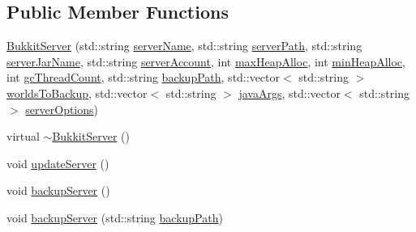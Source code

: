 \subsection*{Public Member Functions}
\begin{DoxyCompactItemize}
\item 
\hyperlink{class_minecraft_server_service_1_1_bukkit_server_ae901c79addfe2c8fa213d9be74140565}{Bukkit\+Server} (std\+::string \hyperlink{class_minecraft_server_service_1_1_bukkit_server_abd8434ba92225f8b6d57c3cffd801f8b}{server\+Name}, std\+::string \hyperlink{class_minecraft_server_service_1_1_bukkit_server_a670b58ed6f157e10f439fd8bd3554081}{server\+Path}, std\+::string \hyperlink{class_minecraft_server_service_1_1_bukkit_server_a715fdfd8db6b4bfd3f0da088193c4c39}{server\+Jar\+Name}, std\+::string \hyperlink{class_minecraft_server_service_1_1_bukkit_server_af39cd743eeb5c6daccdbe07de59b6b44}{server\+Account}, int \hyperlink{class_minecraft_server_service_1_1_bukkit_server_ad8916f8d6fcf0df8922519ba2df42977}{max\+Heap\+Alloc}, int \hyperlink{class_minecraft_server_service_1_1_bukkit_server_a62ebcb90b98dc041c7c819a8af39c320}{min\+Heap\+Alloc}, int \hyperlink{class_minecraft_server_service_1_1_bukkit_server_a4ed7ed606547e75eee8b442e54bcf46d}{gc\+Thread\+Count}, std\+::string \hyperlink{class_minecraft_server_service_1_1_bukkit_server_a85ee657d0612deebbd0d764f85dc70bb}{backup\+Path}, std\+::vector$<$ std\+::string $>$ \hyperlink{class_minecraft_server_service_1_1_bukkit_server_ad4b403d728a418c62cbe1b2167a5c26c}{worlds\+To\+Backup}, std\+::vector$<$ std\+::string $>$ \hyperlink{class_minecraft_server_service_1_1_bukkit_server_a757f2ed305f3d06015729e429e104bea}{java\+Args}, std\+::vector$<$ std\+::string $>$ \hyperlink{class_minecraft_server_service_1_1_bukkit_server_a21e5a43e4dd5fbf5037a6017683b2301}{server\+Options})
\item 
virtual \hyperlink{class_minecraft_server_service_1_1_bukkit_server_a633bf51f2bf2d7f9e96d841266c187e3}{$\sim$\+Bukkit\+Server} ()
\item 
void \hyperlink{class_minecraft_server_service_1_1_bukkit_server_a77fdee48679e182768489020d86e7e8f}{update\+Server} ()
\item 
void \hyperlink{class_minecraft_server_service_1_1_bukkit_server_a53bab0244678db1586fb3544c3e66c9e}{backup\+Server} ()
\item 
void \hyperlink{class_minecraft_server_service_1_1_bukkit_server_afbd8754f15d30c31b498c5e6e256a3d5}{backup\+Server} (std\+::string \hyperlink{class_minecraft_server_service_1_1_bukkit_server_a85ee657d0612deebbd0d764f85dc70bb}{backup\+Path})

\end{DoxyCompactItemize}
